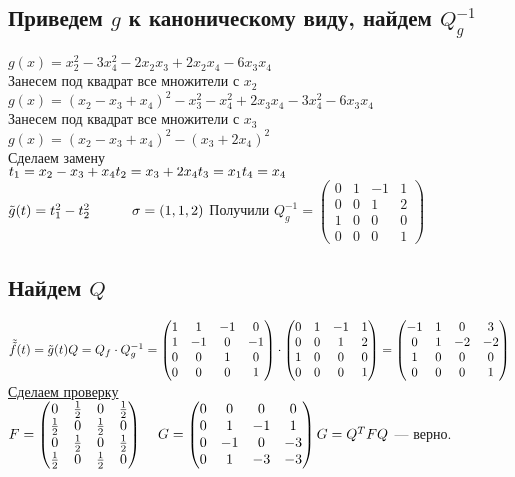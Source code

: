 \documentclass[12pt]{article}
\theoremstyle{remark}
\theoremstyle{definition}
\newcommand{\0}{\mathbb{0}}
\newcommand{\n}{\\[6pt]}
\def\slide#1{\phantom{}\hspace{#1}}
\begin{document}
	\subsection{Приведем $g$ к каноническому виду, найдем $Q_g^{-1}$}
	$g(x) = x_2^2 - 3 x_4^2 - 2x_2 x_3 + 2 x_2 x_4 - 6 x_3 x_4$\n 
	Занесем под квадрат все множители с $x_2$\n
	$g(x) = (x_2 - x_3 + x_4)^2 - x_3^2 - x_4^2 + 2x_3 x_4 - 3x_4^2 - 6x_3 x_4$\n
	Занесем под квадрат все множители с $x_3$\n 
	$g(x) = (x_2 - x_3 + x_4)^2 - (x_3 + 2 x_4)^2$\n 
	Сделаем замену\n
	$t_1 = x_2 - x_3 + x_4\\
	t_2 = x_3 + 2x_4\\
	t_3 = x_1\\
	t_4 = x_4$\n 
	$\tilde{g}(t) = t_1^2 - t_2^2 \slide{30px} \sigma = (1, 1, 2)\n$
	Получили $Q^{-1}_g = \begin{pmatrix}
		0 & 1 & -1 & 1\\
		0 & 0 & 1 & 2\\
		1 & 0 & 0 & 0\\
		0 & 0 & 0 & 1
	\end{pmatrix}$
	\subsection{Найдем $Q$}
	$\tilde{\tilde{f}}(t) = \tilde{g}(t)\n 
	Q = Q_f \cdot Q^{-1}_g = \begin{pmatrix}
	1 & 1 & -1 & 0\\
	1 & -1 & 0 & -1\\
	0 & 0 & 1 & 0\\
	0 & 0 & 0 & 1
	\end{pmatrix} \cdot \begin{pmatrix}
	0 & 1 & -1 & 1\\
	0 & 0 & 1 & 2\\
	1 & 0 & 0 & 0\\
	0 & 0 & 0 & 1
	\end{pmatrix} = \begin{pmatrix}
		-1 & 1 & 0 & 3\\0 & 1 & -2 & -2\\
		1 & 0 & 0 & 0\\
		0 & 0 & 0 & 1
	\end{pmatrix}$\n 
	\underline{Сделаем проверку}\n
	$F = \begin{pmatrix}
		0 & \frac{1}{2} & 0 & \frac{1}{2}\\
		\frac{1}{2} & 0 & \frac{1}{2} & 0\\
		0 & \frac{1}{2} & 0 & \frac{1}{2}\\
		\frac{1}{2} & 0 & \frac{1}{2} & 0
	\end{pmatrix}\; \; \; \; G = \begin{pmatrix}
		0 & 0 & 0 & 0\\
		0 & 1 & -1 & 1\\
		0 & -1 & 0 & -3\\
		0 & 1 & -3 & -3
	\end{pmatrix}\n 
	G = Q^T F Q$ --- верно.
\end{document}
